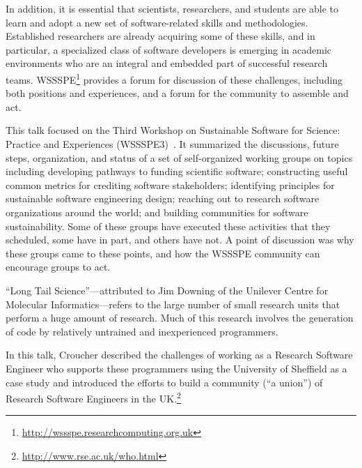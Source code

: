 \documentclass[a4paper,UKenglish]{dagrep}
\begin{document}
In addition, it is essential that scientists, researchers, and students are able to learn and adopt a new set of software-related skills and methodologies. Established researchers are already acquiring some of these skills, and in particular, a specialized class of software developers is emerging in academic environments who are an integral and embedded part of successful research teams. WSSSPE\footnote{\url{http://wssspe.researchcomputing.org.uk}} provides a forum for discussion of these challenges, including both positions and experiences, and a forum for the community to assemble and act.

This talk focused on the Third Workshop on Sustainable Software for Science: Practice and Experiences (WSSSPE3)~\cite{wssspe3}. It summarized the discussions, future steps, organization, and status of a set of self-organized working groups on topics including developing pathways to funding scientific software; constructing useful common metrics for crediting software stakeholders; identifying principles for sustainable software engineering design; reaching out to research software organizations around the world; and building communities for software sustainability. Some of these groups have executed these activities that they scheduled, some have in part, and others have not.  A point of discussion was why these groups came to these points, and how the WSSSPE community can encourage groups to act.


``Long Tail Science''---attributed to Jim Downing of the Unilever Centre for Molecular Informatics---refers to the large number of small research units that perform a huge amount of research. Much of this research involves the generation of code by relatively untrained and inexperienced programmers.

In this talk, Croucher described the challenges of working as a Research Software Engineer who supports these programmers using the University of Sheffield as a case study and introduced the efforts to build a community (``a union'') of Research Software Engineers in the UK.\footnote{\url{http://www.rse.ac.uk/who.html}}

\end{document}
